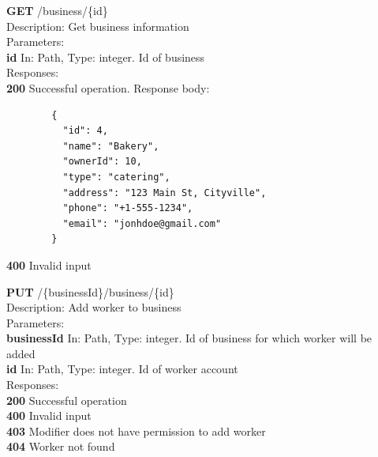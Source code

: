 \documentclass[11pt,a4paper,pdftex]{article}
\begin{document}
\hspace*{1em}\textbf{GET} /business/\{id\}\\
\hspace*{2em}Description: Get business information\\
\hspace*{2em}Parameters:\\
\hspace*{3em}\textbf{id} In: Path, Type: integer. Id of business\\
\hspace*{2em}Responses:\\
\hspace*{3em}\textbf{200} Successful operation. Response body:
\begin{verbatim}
        {
          "id": 4,
          "name": "Bakery",
          "ownerId": 10,
          "type": "catering",
          "address": "123 Main St, Cityville",
          "phone": "+1-555-1234",
          "email": "jonhdoe@gmail.com"
        }
\end{verbatim}
\hspace*{3em}\textbf{400} Invalid input

\hspace*{1em}\textbf{PUT} /\{businessId\}/business/\{id\}\\
\hspace*{2em}Description: Add worker to business\\
\hspace*{2em}Parameters:\\
\hspace*{3em}\textbf{businessId} In: Path, Type: integer. Id of business for which worker will be added\\
\hspace*{3em}\textbf{id} In: Path, Type: integer. Id of worker account\\
\hspace*{2em}Responses:\\
\hspace*{3em}\textbf{200} Successful operation\\
\hspace*{3em}\textbf{400} Invalid input\\
\hspace*{3em}\textbf{403} Modifier does not have permission to add worker\\
\hspace*{3em}\textbf{404} Worker not found
\end{document}
